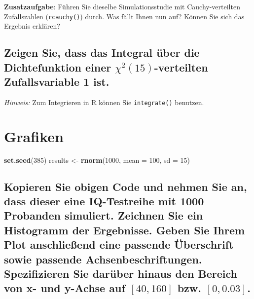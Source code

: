 \documentclass[12pt,a4paper]{article}
\newenvironment{Shaded}{\begin{snugshade}}{\end{snugshade}}
\newcommand{\AttributeTok}[1]{\textcolor[rgb]{0.13,0.29,0.53}{#1}}
\newcommand{\DecValTok}[1]{\textcolor[rgb]{0.00,0.00,0.81}{#1}}
\newcommand{\FunctionTok}[1]{\textcolor[rgb]{0.13,0.29,0.53}{\textbf{#1}}}
\newcommand{\NormalTok}[1]{#1}
\newcommand{\OtherTok}[1]{\textcolor[rgb]{0.56,0.35,0.01}{#1}}
\begin{document}
\textbf{Zusatzaufgabe}: Führen Sie dieselbe Simulationsstudie mit
Cauchy-verteilten Zufallszahlen (\texttt{rcauchy()}) durch. Was fällt
Ihnen nun auf? Können Sie sich das Ergebnis erklären?

\subsection{\texorpdfstring{Zeigen Sie, dass das Integral über die
Dichtefunktion einer \(\chi^2(15)\)-verteilten Zufallsvariable 1
ist.}{Zeigen Sie, dass das Integral über die Dichtefunktion einer \textbackslash chi\^{}2(15)-verteilten Zufallsvariable 1 ist.}}\label{zeigen-sie-dass-das-integral-uxfcber-die-dichtefunktion-einer-chi215-verteilten-zufallsvariable-1-ist.}

\emph{Hinweis:} Zum Integrieren in R können Sie \texttt{integrate()}
benutzen.

\section{Grafiken}\label{grafiken}

\begin{Shaded}
\begin{Highlighting}[]
\FunctionTok{set.seed}\NormalTok{(}\DecValTok{385}\NormalTok{)}
\NormalTok{results }\OtherTok{\textless{}{-}} \FunctionTok{rnorm}\NormalTok{(}\DecValTok{1000}\NormalTok{, }\AttributeTok{mean =} \DecValTok{100}\NormalTok{, }\AttributeTok{sd =} \DecValTok{15}\NormalTok{)}
\end{Highlighting}
\end{Shaded}

\subsection{\texorpdfstring{Kopieren Sie obigen Code und nehmen Sie an,
dass dieser eine IQ-Testreihe mit 1000 Probanden simuliert. Zeichnen Sie
ein Histogramm der Ergebnisse. Geben Sie Ihrem Plot anschließend eine
passende Überschrift sowie passende Achsenbeschriftungen. Spezifizieren
Sie darüber hinaus den Bereich von x- und y-Achse auf \([40,160]\) bzw.
\([0,0.03]\).}{Kopieren Sie obigen Code und nehmen Sie an, dass dieser eine IQ-Testreihe mit 1000 Probanden simuliert. Zeichnen Sie ein Histogramm der Ergebnisse. Geben Sie Ihrem Plot anschließend eine passende Überschrift sowie passende Achsenbeschriftungen. Spezifizieren Sie darüber hinaus den Bereich von x- und y-Achse auf {[}40,160{]} bzw. {[}0,0.03{]}.}}\label{kopieren-sie-obigen-code-und-nehmen-sie-an-dass-dieser-eine-iq-testreihe-mit-1000-probanden-simuliert.-zeichnen-sie-ein-histogramm-der-ergebnisse.-geben-sie-ihrem-plot-anschlieuxdfend-eine-passende-uxfcberschrift-sowie-passende-achsenbeschriftungen.-spezifizieren-sie-daruxfcber-hinaus-den-bereich-von-x--und-y-achse-auf-40160-bzw.-00.03.}
\end{document}
